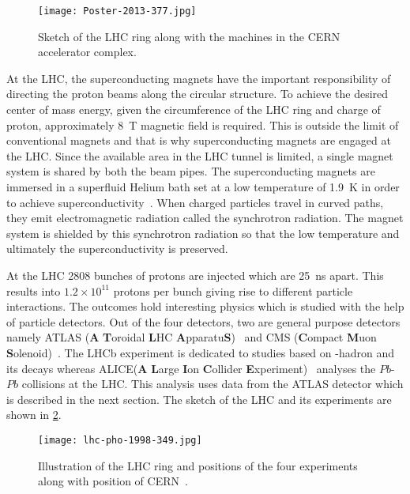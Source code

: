 \begin{figure}[htbp]
    \centering
    \texttt{[image: Poster-2013-377.jpg]}
    \caption[Sketch of the CERN accelerator complex]{Sketch of the LHC ring along with the machines in the CERN accelerator complex\cite{Haffner:1621894}.}%
    \label{fig:acc_complex}
\end{figure}

At the LHC, the superconducting magnets have the important responsibility of directing the proton beams 
along the circular structure. To achieve the desired center of mass energy, 
given the circumference of the LHC ring and charge of proton, approximately \SI{8}{\tesla} magnetic field is 
required. This is outside the limit of conventional magnets and that is why superconducting magnets are 
engaged at the LHC. Since the 
available area in the LHC tunnel is limited, a single magnet system is shared by both the beam pipes. The 
superconducting magnets are immersed in a superfluid Helium bath set at 
a low temperature of \SI{1.9}{\kelvin} in order to achieve superconductivity~\cite{Rossi:630341}. 
When charged particles travel in curved paths, they emit electromagnetic radiation called the 
synchrotron radiation. The magnet system is shielded by this synchrotron radiation so that the low
temperature and ultimately the superconductivity is preserved. 

At the LHC 2808 bunches of protons are injected which are \SI{25}{\ns} apart. This results into 
$1.2 \times 10^{11}$ protons per bunch giving rise to different particle interactions. 
The outcomes hold interesting physics which is studied with the help of particle detectors. 
Out of the four detectors, two are general purpose detectors namely ATLAS (\textbf{A} \textbf{T}oroidal \textbf{L}HC \textbf{A}pparatu\textbf{S})~\cite{PERF-2007-01} and
CMS (\textbf{C}ompact \textbf{M}uon \textbf{S}olenoid)~\cite{CMS-CMS-00-001}. The LHCb experiment\cite{TheLHCbCollaboration_2008} is dedicated to 
studies based on \PB-hadron and its decays whereas ALICE(\textbf{A} \textbf{L}arge \textbf{I}on \textbf{C}ollider \textbf{E}xperiment)~\cite{TheALICECollaboration_2008}
analyses the $Pb$-$Pb$ collisions at the LHC. This analysis uses data from the ATLAS detector
which is described in the next section. The sketch of 
the LHC and its experiments are shown in \cref{fig:lhc}.


\begin{figure}[htbp]
    \centering
    \texttt{[image: lhc-pho-1998-349.jpg]}
    \caption[LHC and its experiments]{Illustration of the LHC ring and positions of the 
    four experiments along with position of CERN~\cite{Jean-Luc:841555}.}%
    \label{fig:lhc}
\end{figure}

